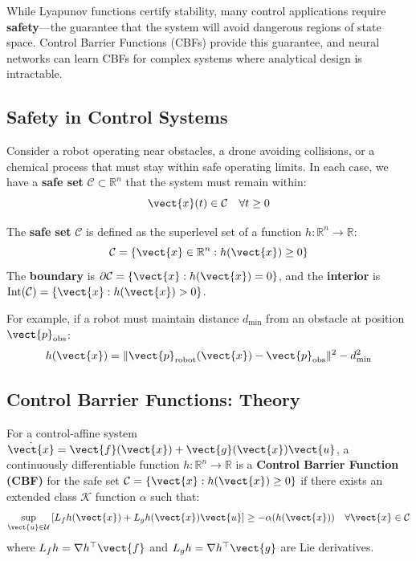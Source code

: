 While Lyapunov functions certify stability, many control applications require \textbf{safety}---the guarantee that the system will avoid dangerous regions of state space. Control Barrier Functions (CBFs) provide this guarantee, and neural networks can learn CBFs for complex systems where analytical design is intractable.

\subsection{Safety in Control Systems}

Consider a robot operating near obstacles, a drone avoiding collisions, or a chemical process that must stay within safe operating limits. In each case, we have a \textbf{safe set} $\mathcal{C} \subset \mathbb{R}^n$ that the system must remain within:
\begin{equation}
\vect{x}(t) \in \mathcal{C} \quad \forall t \geq 0
\label{eq:safety_constraint}
\end{equation}

\begin{definition}
The \textbf{safe set} $\mathcal{C}$ is defined as the superlevel set of a function $h: \mathbb{R}^n \to \mathbb{R}$:
\begin{equation}
\mathcal{C} = \{\vect{x} \in \mathbb{R}^n : h(\vect{x}) \geq 0\}
\label{eq:safe_set}
\end{equation}
The \textbf{boundary} is $\partial \mathcal{C} = \{\vect{x} : h(\vect{x}) = 0\}$, and the \textbf{interior} is $\text{Int}(\mathcal{C}) = \{\vect{x} : h(\vect{x}) > 0\}$.
\end{definition}

For example, if a robot must maintain distance $d_{\min}$ from an obstacle at position $\vect{p}_{\text{obs}}$:
\begin{equation}
h(\vect{x}) = \|\vect{p}_{\text{robot}}(\vect{x}) - \vect{p}_{\text{obs}}\|^2 - d_{\min}^2
\end{equation}

\subsection{Control Barrier Functions: Theory}

\begin{definition}
\label{def:cbf}
For a control-affine system $\dot{\vect{x}} = \vect{f}(\vect{x}) + \vect{g}(\vect{x})\vect{u}$, a continuously differentiable function $h: \mathbb{R}^n \to \mathbb{R}$ is a \textbf{Control Barrier Function (CBF)} for the safe set $\mathcal{C} = \{\vect{x} : h(\vect{x}) \geq 0\}$ if there exists an extended class $\mathcal{K}$ function $\alpha$ such that:
\begin{equation}
\sup_{\vect{u} \in \mathcal{U}} \left[ L_f h(\vect{x}) + L_g h(\vect{x}) \vect{u} \right] \geq -\alpha(h(\vect{x})) \quad \forall \vect{x} \in \mathcal{C}
\label{eq:cbf_condition}
\end{equation}
where $L_f h = \nabla h^\top \vect{f}$ and $L_g h = \nabla h^\top \vect{g}$ are Lie derivatives.
\end{definition}

